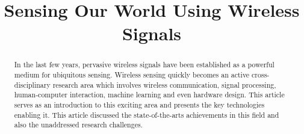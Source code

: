 \documentclass[conference]{IEEEtran}
\begin{document}
%
\title{Sensing Our World Using Wireless Signals}


\author{}

\maketitle

\begin{abstract}
In the last few years, pervasive wireless signals have been established as a powerful medium for ubiquitous sensing. %
Wireless sensing quickly becomes an active cross-disciplinary research area which involves wireless communication, signal processing, human-computer interaction, machine learning and even hardware design. This article serves as an introduction to this exciting area and presents the key technologies enabling it. This article discussed the state-of-the-arts achievements in this field and also the unaddressed research challenges.
\end{abstract}


\IEEEpeerreviewmaketitle










\footnotesize


\end{document}
